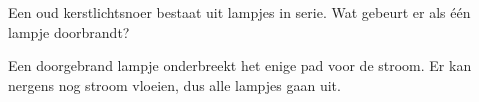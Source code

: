 \documentclass{ximera}
\begin{document}
\begin{question}
    Een oud kerstlichtsnoer bestaat uit lampjes in serie. Wat gebeurt er als één lampje doorbrandt?
    \begin{multipleChoice}
    \end{multipleChoice}
    \begin{solution}
        Een doorgebrand lampje onderbreekt het enige pad voor de stroom. Er kan nergens nog stroom vloeien, dus alle lampjes gaan uit.
    \end{solution}
\end{question}
\end{document}
